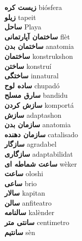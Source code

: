 \textbf{ زیست کره  } biósfera \\
\textbf{ زیلو  } tapeit \\
\textbf{ ساحل  } Playa \\
\textbf{ ساختمان آپارتمانی  } flèt \\
\textbf{ ساختمان بدن  } anatomia \\
\textbf{ ساختمان  } konstrukshon \\
\textbf{ ساختن  } konstruí \\
\textbf{ ساختگی  } innatural \\
\textbf{ ساده لوح  } chupadó \\
\textbf{ سارق مسلح  } bandidu \\
\textbf{ سازش کردن  } komportá \\
\textbf{ سازش  } adaptashon \\
\textbf{ سازمان بدن  } anatomia \\
\textbf{ سازمان دهنده  } catalisado \\
\textbf{ سازگار  } agradabel \\
\textbf{ سازگاری  } adaptabilidat \\
\textbf{ ساعت شماطه ای  } wèker \\
\textbf{ ساعت  } oloshi \\
\textbf{ ساعی  } brio \\
\textbf{ سالار  } kapitan \\
\textbf{ سالن  } anfiteatro \\
\textbf{ سالنامه  } kalènder \\
\textbf{ سانتی متر  } centimetro \\
\textbf{ سانتیم  } sèn \\
